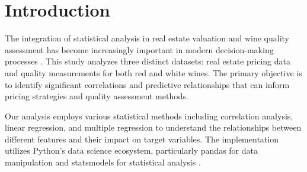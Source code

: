\section{Introduction}
The integration of statistical analysis in real estate valuation and wine quality assessment has become increasingly important in modern decision-making processes \cite{cortez2009modeling}. This study analyzes three distinct datasets: real estate pricing data and quality measurements for both red and white wines. The primary objective is to identify significant correlations and predictive relationships that can inform pricing strategies and quality assessment methods.

Our analysis employs various statistical methods including correlation analysis, linear regression, and multiple regression to understand the relationships between different features and their impact on target variables. The implementation utilizes Python's data science ecosystem, particularly pandas for data manipulation and statsmodels for statistical analysis \cite{mckinney2012python}. 